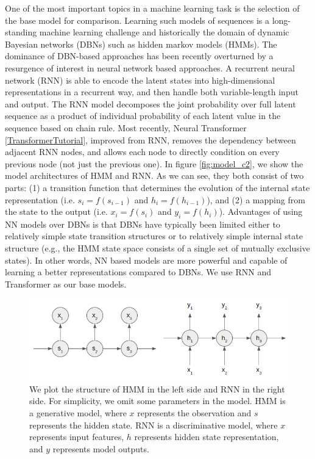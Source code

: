 One of the most important topics in a machine learning task is the selection of the base model for comparison. Learning such models of sequences is a long-standing machine learning challenge and historically the domain of dynamic Bayesian networks (DBNs) such as hidden markov models (HMMs). The dominance of DBN-based approaches has been recently overturned by a resurgence of interest in neural network based approaches. A recurrent neural network (RNN) is able to encode the latent states into high-dimensional representations in a recurrent way, and then handle both variable-length input and output. The RNN model decomposes the joint probability over full latent sequence as a product of individual probability of each latent value in the sequence based on chain rule. Most recently, Neural Transformer \ref{TransformerTutorial}, improved from RNN, removes the dependency between adjacent RNN nodes, and allows each node to directly condition on every previous node (not just the previous one). In figure \ref{fig:model_c2}, we show the model architectures of HMM and RNN. As we can see, they both consist of two parts: (1) a transition function that determines the evolution of the internal state representation (i.e. $s_i=f(s_{i-1})$ and $h_i=f(h_{i-1})$), and (2) a mapping from the state to the output (i.e. $x_i=f(s_i)$ and $y_i=f(h_i)$). Advantages of using NN models over DBNs is that DBNs have typically been limited either to relatively simple state transition structures or to relatively simple internal state structure (e.g., the HMM state space consists of a single set of mutually exclusive states). In other words, NN based models are more powerful and capable of learning a better representations compared to DBNs. We use RNN and Transformer as our base models.

\begin{figure}[t] 
\centering
\includegraphics[width=1.0\columnwidth]{Images/rnn_hmm.png} 
  \caption{We plot the structure of HMM in the left side and RNN in the right side. For simplicity, we omit some parameters in the model. HMM is a generative model, where $x$ represents the observation and $s$ represents the hidden state. RNN is a discriminative model, where $x$ represents input features, $h$ represents hidden state representation, and $y$ represents model outputs.}
\end{figure}\label{fig:model_c2} 

